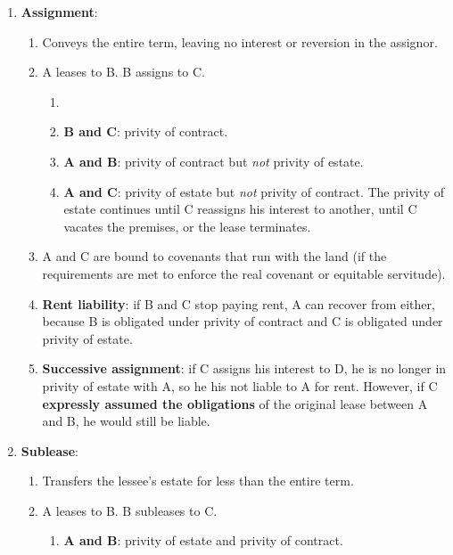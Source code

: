 \begin{enumerate}
    \item \textbf{Assignment}:
    \begin{enumerate}
        \item Conveys the entire term, leaving no interest or reversion in the 
        assignor.
        \item A leases to B. B assigns to C.
        \begin{enumerate}
            \item \item \textbf{B and C}: privity of contract. %
            \item \textbf{A and B}: privity of contract but \emph{not} privity 
            of estate.
            \item \textbf{A and C}: privity of estate but \emph{not} privity 
            of contract. The privity of estate continues until C reassigns his 
            interest to another, until C vacates the premises, or the lease 
            terminates.
        \end{enumerate}
        \item A and C are bound to covenants that run with the land (if the 
        requirements are met to enforce the real covenant or equitable 
        servitude).
        \item \textbf{Rent liability}: if B and C stop paying rent, A can 
        recover from either, because B is obligated under privity of contract 
        and C is obligated under privity of estate.
        \item \textbf{Successive assignment}: if C assigns his interest to D, 
        he is no longer in privity of estate with A, so he his not liable to A 
        for rent. However, if C \textbf{expressly assumed the obligations} of 
        the original lease between A and B, he would still be liable.
    \end{enumerate}
    \item \textbf{Sublease}: 
    \begin{enumerate}
        \item Transfers the lessee's estate for less than the entire term.
        \item A leases to B. B subleases to C.
        \begin{enumerate}
            \item \textbf{A and B}: privity of estate and privity of contract.

\end{enumerate}
\end{enumerate}
\end{enumerate}
